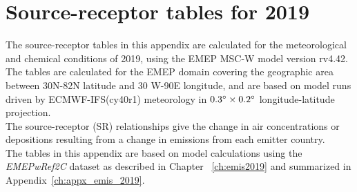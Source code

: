 \setcounter{page}{1}

\cleardoublepage
\chapter[SR tables for 2019]{Source-receptor tables for 2019}
\label{ch:appx_sr2019}



The source-receptor tables in this appendix are calculated for the
meteorological and chemical conditions of 2019, using the EMEP MSC-W model version rv4.42. The tables are calculated for the EMEP domain covering the geographic area between 30\degrees N-82\degrees N latitude and 30\degrees 
W-90\degrees E longitude, and are based on model runs driven by ECMWF-IFS(cy40r1) meteorology in $0.3^{\circ} \times 0.2^{\circ}$ longitude-latitude projection.\\

The source-receptor (SR) relationships give the change in air concentrations or depositions resulting from a
change in emissions from each emitter country.\\ 

The tables in this appendix are based on model calculations using the \textit{EMEPwRef2C} dataset as described in Chapter ~\ref{ch:emis2019} and summarized in Appendix~\ref{ch:appx_emis_2019}.

